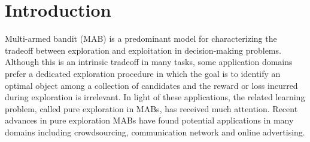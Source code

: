\documentclass{article}
\newcommand{\Problem}{{CPE}\xspace}
\begin{document}
\begin{abstract}



\end{abstract}
\vspace{-0.3em}
\section{Introduction}
\vspace{-0.3em}
Multi-armed bandit (MAB) is a predominant model for characterizing the tradeoff between exploration and exploitation in decision-making problems. 
Although this is an intrinsic tradeoff in many tasks, some application domains prefer a dedicated exploration procedure in which the goal is to identify an optimal object among a collection of candidates and the reward or loss incurred during exploration is irrelevant.
In light of these applications, the related learning problem, called pure exploration in MABs, has received much attention.
Recent advances in pure exploration MABs have found potential applications in many domains including crowdsourcing, communication network and online advertising.
\end{document}
